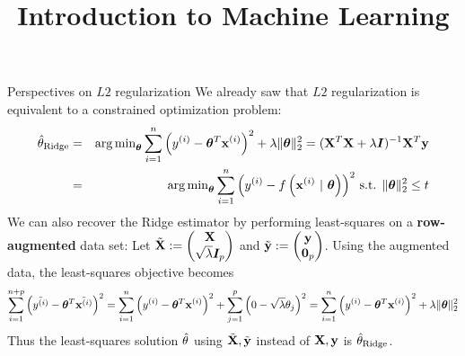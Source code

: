 \documentclass[11pt,compress,t,notes=noshow, xcolor=table]{beamer}
\title{Introduction to Machine Learning}
\date{}
\begin{document}



\begin{vbframe}{Perspectives on $L2$ regularization}
We already saw that $L2$ regularization is equivalent to a constrained optimization problem:
\begin{eqnarray*}  
  \hat{\theta}_{\text{Ridge}} &=& \operatorname{arg\,min}_{\bm{\theta}} \sum\limits_{i=1}^n \left(y^{(i)} - \bm{\theta}^T \mathbf{x}^{(i)} \right)^2 + \lambda \|\bm{\theta}\|_2^2 = ({\mathbf{X}}^T \mathbf{X}  + \lambda \boldsymbol{I})^{-1} \mathbf{X}^T\mathbf{y}\\
  &=& \operatorname{arg\,min}_{\bm{\theta}} \sum\limits_{i=1}^n \left(y^{(i)} - f\left(\mathbf{x}^{(i)} ~|~ \bm{\theta}\right)\right)^2 \,
  \text{s.t. } \|\bm{\theta}\|_2^2  \leq t
  \end{eqnarray*}
We can also recover the Ridge estimator by performing least-squares on a \textbf{row-augmented} data set: Let \scriptsize{$\tilde{\mathbf{X}}:= \begin{pmatrix} \mathbf{X} \\ \sqrt{\lambda} \boldsymbol{I}_{p} \end{pmatrix}$ and $\tilde{\mathbf{y}} := \begin{pmatrix}
    \mathbf{y} \\ \bm{0}_{p}
\end{pmatrix}$.} \normalsize{Using the augmented data, the least-squares objective becomes}
\small{
$$%
\sum_{i=1}^{n+p} \left(\tilde{\yi} - \thetab^T \tilde{\xi} \right)^2 = %
\sum_{i=1}^{n} \left(\yi - \thetab^T \xi \right)^2 + \sum_{j=1}^{p} \left(0 - \sqrt{\lambda} \theta_j \right)^2 %
=\sumin \left(\yi - \thetab^T \xi \right)^2 + \lambda \|\thetab\|_2^2
$$
}
\normalsize{Thus the least-squares solution $\hat{\theta}$ using $\tilde{\mathbf{X}},\tilde{\mathbf{y}}$ instead of $\mathbf{X}, \mathbf{y}$ is $\hat{\theta}_{\text{Ridge}}$.}
\end{vbframe}

\endlecture
\end{document}
